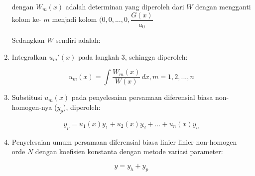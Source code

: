 \begin{enumerate}[1.]
	dengan \begin{math} W_m (x) \end{math} adalah determinan yang diperoleh dari \begin{math} W \end{math} dengan mengganti kolom ke- \begin{math} m \end{math} menjadi kolom \begin{math} (0, 0, ..., 0, \dfrac{G (x)}{a_0} \end{math}

	Sedangkan \begin{math} W \end{math} sendiri adalah: 

%
%

	\item Integralkan \begin{math} u_m ' (x) \end{math} pada langkah 3, sehingga diperoleh:

	\begin{equation} u_m (x) = \int \dfrac{W_m (x)}{W(x)} \, dx , m = 1, 2, ..., n \end{equation}

	\item Substitusi \begin{math} u_m (x) \end{math} pada penyelesaian persamaan diferensial biasa non-homogen-nya (\begin{math} y_p \end{math}), diperoleh:

	\begin{equation} y_p = u_1 (x) y_1 + u_2 (x) y_2 + ... + u_n (x) y_n \end{equation}

	\item Penyelesaian umum persamaan diferensial biasa linier linier non-homogen orde \begin{math} N \end{math} dengan koefisien konstanta dengan metode variasi parameter:

	\begin{displaymath} y = y_h + y_p \end{displaymath}

\end{enumerate}

